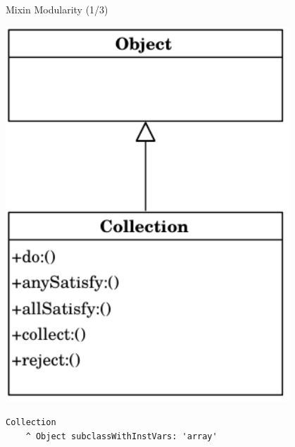 \documentclass[xcolor=dvipsname, handout]{beamer} %
\begin{document}
\begin{frame}[fragile]{Mixin Modularity (1/3)}
\begin{minipage}{0.3\textwidth}
\centering
\includegraphics[width=0.8\textwidth]{mixin_basic.pdf}
\end{minipage} %
\begin{minipage}{0.65\textwidth}
\begin{lstlisting}
Collection
    ^ Object subclassWithInstVars: 'array'
\end{lstlisting}
\end{minipage}
\end{frame}
\end{document}
